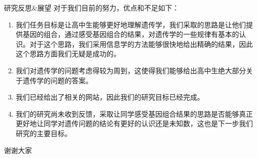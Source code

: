 \documentclass{beamer}
\begin{document}
	\begin{frame}{研究反思\&展望}
		对于我们目前的努力，优点和不足如下：
		\begin{enumerate}
			\item 我们任务目标是让高中生能够更好地理解遗传学，我们采取的思路是让他们提供基因的组合，通过感受基因组合的结果，对遗传学的一些规律有基本的认识。对于这个思路，我们采用信息学的方法能够很快地给出精确的结果，因此这个思路方面我们无疑是成功的。
			\item 我们对遗传学的问题考虑得较为周到，这使得我们能够给出高中生绝大部分关于遗传学的问题的答案。
			\item 我们已经给出了相关的网站，因此我们的研究目标已经完成。
			\item 我们的研究尚未收到反馈，采取让同学感受基因组合结果的思路是否能够真正更好地让同学对遗传问题的结论有更好的认识还是未知数，这也是下一步我们研究的主要目标。
		\end{enumerate}
	\end{frame}

	\begin{frame}{}
		\centering \huge 谢谢大家
	\end{frame}
\end{document}

